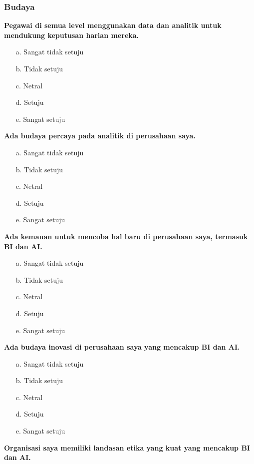 \documentclass{article}
\begin{document}
\subsubsection{Budaya}

\textbf{Pegawai di semua level menggunakan data dan analitik untuk mendukung keputusan harian mereka.}

\begin{enumerate}
	\item[a.] Sangat tidak setuju
	\item[b.] Tidak setuju
	\item[c.] Netral
	\item[d.] Setuju
	\item[e.] Sangat setuju
\end{enumerate}

\textbf{Ada budaya percaya pada analitik di perusahaan saya.}

\begin{enumerate}
	\item[a.] Sangat tidak setuju
	\item[b.] Tidak setuju
	\item[c.] Netral
	\item[d.] Setuju
	\item[e.] Sangat setuju
\end{enumerate}

\textbf{Ada kemauan untuk mencoba hal baru di perusahaan saya, termasuk BI dan AI.}

\begin{enumerate}
	\item[a.] Sangat tidak setuju
	\item[b.] Tidak setuju
	\item[c.] Netral
	\item[d.] Setuju
	\item[e.] Sangat setuju
\end{enumerate}

\textbf{Ada budaya inovasi di perusahaan saya yang mencakup BI dan AI.}

\begin{enumerate}
	\item[a.] Sangat tidak setuju
	\item[b.] Tidak setuju
	\item[c.] Netral
	\item[d.] Setuju
	\item[e.] Sangat setuju
\end{enumerate}

\textbf{Organisasi saya memiliki landasan etika yang kuat yang mencakup BI dan AI.}
\end{document}
